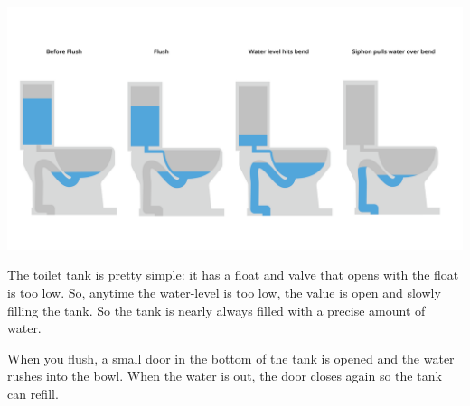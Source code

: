 \includegraphics[width=\textwidth]{toilet.png}


The toilet tank is pretty simple: it has a float and valve that opens with the float is too low.   So, anytime the water-level is too low,  the value is open and slowly filling the tank.   So the tank is nearly always filled with a precise amount of water.

When you flush,  a small door in the bottom of the tank is opened and the water rushes into the bowl.  When the water is out,  the door closes again so the tank can refill.
